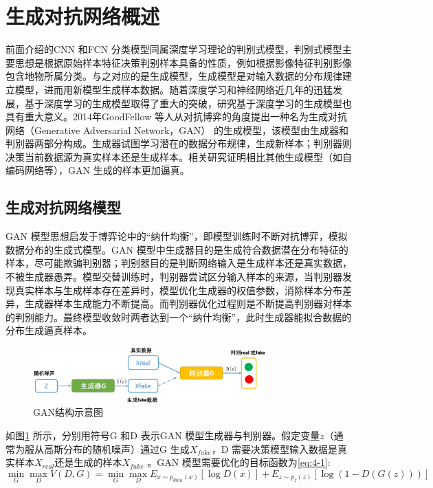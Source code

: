 \section{生成对抗网络概述}
\label{sec:chap02-3}
前面介绍的CNN 和FCN 分类模型同属深度学习理论的判别式模型，判别式模型主要思想是根据原始样本特征决策判别样本具备的性质，例如根据影像特征判别影像包含地物所属分类。与之对应的是生成模型，生成模型是对输入数据的分布规律建立模型，进而用新模型生成样本数据。随着深度学习和神经网络近几年的迅猛发展，基于深度学习的生成模型取得了重大的突破，研究基于深度学习的生成模型也具有重大意义。2014年GoodFellow 等人从对抗博弈的角度提出一种名为生成对抗网络（Generative Adversarial Network，GAN）\cite{goodfellow2014generative} 的生成模型，该模型由生成器和判别器两部分构成。生成器试图学习潜在的数据分布规律，生成新样本；判别器则决策当前数据源为真实样本还是生成样本。相关研究\cite{mirza2014conditional}证明相比其他生成模型（如自编码网络等），GAN 生成的样本更加逼真。

\subsection{生成对抗网络模型}
\label{sec:first-1}
GAN 模型思想启发于博弈论中的“纳什均衡”，即模型训练时不断对抗博弈，模拟数据分布的生成式模型。GAN 模型中生成器目的是生成符合数据潜在分布特征的样本，尽可能欺骗判别器；判别器目的是判断网络输入是生成样本还是真实数据，不被生成器愚弄。模型交替训练时，判别器尝试区分输入样本的来源，当判别器发现真实样本与生成样本存在差异时，模型优化生成器的权值参数，消除样本分布差异，生成器样本生成能力不断提高。而判别器优化过程则是不断提高判别器对样本的判别能力。最终模型收敛时两者达到一个“纳什均衡”，此时生成器能拟合数据的分布生成逼真样本。

\begin{figure}[htb]
  \centering
  \includegraphics[width=0.8\textwidth]{figures/gan}
  \caption{GAN结构示意图}\label{fig:gan}
\end{figure}

如图\ref{fig:gan} 所示，分别用符号G 和D 表示GAN 模型生成器与判别器。假定变量$z$（通常为服从高斯分布的随机噪声）通过G 生成$X_{fake}$，D 需要决策模型输入数据是真实样本$X_{real}$还是生成的样本$X_{fake}$ 。GAN 模型需要优化的目标函数为\ref{eq:4-1}:
\begin{equation}
  \label{eq:4-1}
  \mathop{\min}_{G} \mathop{\max}_{D} V(D,G) = \mathop{\min}_{G} \mathop{\max}_{D} E_{x \sim p_{data}(x)} [\log D(x)] + E_{z \sim p_{z}(z)}[ \log (1-D(G(z)))]
\end{equation}

